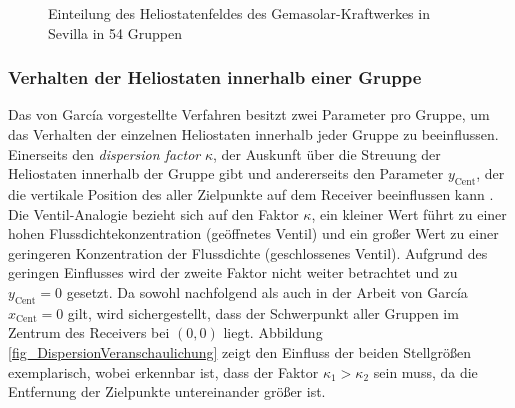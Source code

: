 \begin{figure}[h!]
    \centering
    \setlength{\fboxsep}{1pt}
    \setlength{\fboxrule}{1pt}
    \caption[Einteilung des Heliostatenfeldes des Gemasolar-Kraftwerkes in Sevilla in 54 Gruppen]{Einteilung des Heliostatenfeldes des Gemasolar-Kraftwerkes in Sevilla in 54 Gruppen \cite[S.10]{Garcia2}}
    \label{fig_VerteilungHeliostateGarcia}
\end{figure}

\subsubsection*{Verhalten der Heliostaten innerhalb einer Gruppe} \label{subsubsec_Gruppenverhalten}
Das von García vorgestellte Verfahren besitzt zwei Parameter pro Gruppe, um das Verhalten der einzelnen Heliostaten innerhalb jeder Gruppe zu beeinflussen.
Einerseits den \textit{dispersion factor} $\kappa$, der Auskunft über die Streuung der Heliostaten innerhalb der Gruppe gibt und andererseits den Parameter $y_{\mathrm{Cent}}$, der die vertikale Position des  aller Zielpunkte auf dem Receiver beeinflussen kann \cite[S.5]{Garcia2}.
Die Ventil-Analogie bezieht sich auf den Faktor $\kappa$, ein kleiner Wert führt zu einer hohen Flussdichtekonzentration (geöffnetes Ventil) und ein großer Wert zu einer geringeren Konzentration der Flussdichte (geschlossenes Ventil).
Aufgrund des geringen Einflusses wird der zweite Faktor nicht weiter betrachtet und zu $y_{\mathrm{Cent}} = 0$ gesetzt.
Da sowohl nachfolgend als auch in der Arbeit von García $x_{\mathrm{Cent}} = 0$ gilt, wird sichergestellt, dass der Schwerpunkt aller Gruppen im Zentrum des Receivers bei $(0,0)$ liegt.
Abbildung \ref{fig_DispersionVeranschaulichung} zeigt den Einfluss der beiden Stellgrößen exemplarisch, wobei erkennbar ist, dass der Faktor $\kappa_1 > \kappa_2$ sein muss, da die Entfernung der Zielpunkte untereinander größer ist.

